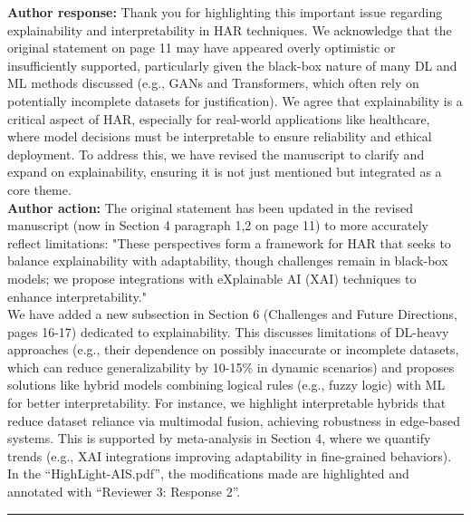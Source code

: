 \documentclass[Afour,sageh,times]{sagej}
\begin{document}
\textbf{Author response:} Thank you for highlighting this important issue regarding explainability and interpretability in HAR techniques. We acknowledge that the original statement on page 11 may have appeared overly optimistic or insufficiently supported, particularly given the black-box nature of many DL and ML methods discussed (e.g., GANs and Transformers, which often rely on potentially incomplete datasets for justification). We agree that explainability is a critical aspect of HAR, especially for real-world applications like healthcare, where model decisions must be interpretable to ensure reliability and ethical deployment. To address this, we have revised the manuscript to clarify and expand on explainability, ensuring it is not just mentioned but integrated as a core theme.\\
\textbf{Author action:} The original statement has been updated in the revised manuscript (now in Section 4 paragraph 1,2 on page 11) to more accurately reflect limitations: "These perspectives form a framework for HAR that seeks to balance explainability with adaptability, though challenges remain in black-box models; we propose integrations with eXplainable AI (XAI) techniques to enhance interpretability." \\
We have added a new subsection in Section 6 (Challenges and Future Directions, pages 16-17) dedicated to explainability. This discusses limitations of DL-heavy approaches (e.g., their dependence on possibly inaccurate or incomplete datasets, which can reduce generalizability by 10-15\% in dynamic scenarios) and proposes solutions like hybrid models combining logical rules (e.g., fuzzy logic) with ML for better interpretability. For instance, we highlight interpretable hybrids that reduce dataset reliance via multimodal fusion, achieving robustness in edge-based systems. This is supported by meta-analysis in Section 4, where we quantify trends (e.g., XAI integrations improving adaptability in fine-grained behaviors).\\

\textcolor{myOrange}{
In the “HighLight-AIS.pdf”, the modifications made are highlighted and annotated with “Reviewer 3: Response 2”.  }\\

\color{gray}\rule{\linewidth}{1pt}\normalcolor\\
\end{document}
